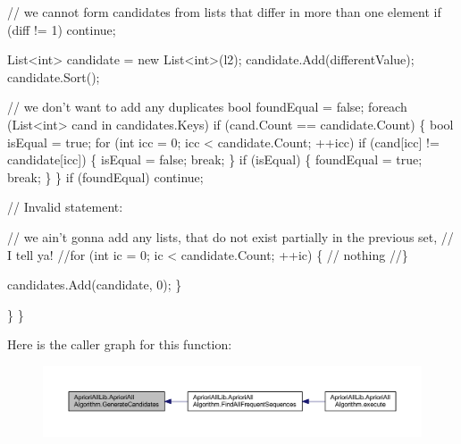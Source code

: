 \begin{DoxyCode}
                    \textcolor{comment}{// we cannot form candidates from lists that differ in more
       than one element}
                    \textcolor{keywordflow}{if} (diff != 1)
                        \textcolor{keywordflow}{continue};

                    List<int> candidate = \textcolor{keyword}{new} List<int>(l2);
                    candidate.Add(differentValue);
                    candidate.Sort();

                    \textcolor{comment}{// we don't want to add any duplicates}
                    \textcolor{keywordtype}{bool} foundEqual = \textcolor{keyword}{false};
                    \textcolor{keywordflow}{foreach} (List<int> cand \textcolor{keywordflow}{in} candidates.Keys)
                        \textcolor{keywordflow}{if} (cand.Count == candidate.Count) \{
                            \textcolor{keywordtype}{bool} isEqual = \textcolor{keyword}{true};
                            \textcolor{keywordflow}{for} (\textcolor{keywordtype}{int} icc = 0; icc < candidate.Count; ++icc)
                                \textcolor{keywordflow}{if} (cand[icc] != candidate[icc]) \{
                                    isEqual = \textcolor{keyword}{false};
                                    \textcolor{keywordflow}{break};
                                \}
                            \textcolor{keywordflow}{if} (isEqual) \{
                                foundEqual = \textcolor{keyword}{true};
                                \textcolor{keywordflow}{break};
                            \}
                        \}
                    \textcolor{keywordflow}{if} (foundEqual)
                        \textcolor{keywordflow}{continue};

                    \textcolor{comment}{// Invalid statement:}

                    \textcolor{comment}{// we ain't gonna add any lists, that do not exist
       partially in the previous set,}
                    \textcolor{comment}{//  I tell ya!}
                    \textcolor{comment}{//for (int ic = 0; ic < candidate.Count; ++ic) \{}
                    \textcolor{comment}{// nothing}
                    \textcolor{comment}{//\}}

                    candidates.Add(candidate, 0);
                \}

            \}
        \}
\end{DoxyCode}


Here is the caller graph for this function\-:
\nopagebreak
\begin{figure}[H]
\begin{center}
\leavevmode
\includegraphics[width=350pt]{class_apriori_all_lib_1_1_apriori_all_algorithm_a1cb8e7f04ae25e5bc2203d35ba7fced3_icgraph}
\end{center}
\end{figure}


